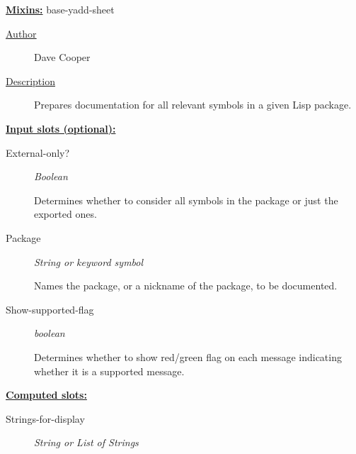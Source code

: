 \documentclass [11pt]{book}
\begin{document}
\begin{itemize}
\textbf{
\underline{Mixins:}} base-yadd-sheet





\begin{description}

\item [
\underline{Author}]


Dave Cooper



\item [
\underline{Description}]


Prepares documentation for all relevant symbols in a given Lisp package.



\end{description}








\textbf{
\underline{Input slots (optional):}}

\begin{description}

\item [External-only?]
\emph{Boolean}

 Determines whether to consider all symbols in the package or just the exported ones.




\item [Package]
\emph{String or keyword symbol}

 Names the package, or a nickname of the package, to be documented.




\item [Show-supported-flag]
\emph{boolean}

 Determines whether to show red/green flag on each message indicating whether it is a
supported message.




\end{description}






\textbf{
\underline{Computed slots:}}

\begin{description}

\item [Strings-for-display]
\emph{String or List of Strings}


\end{description}
\end{itemize}
\end{document}

